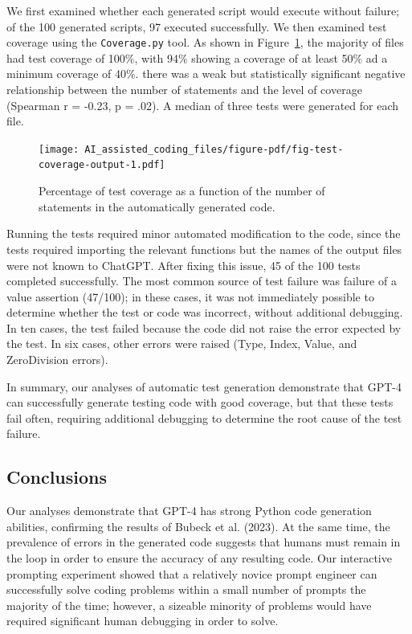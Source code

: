 \documentclass[
]{article}
\begin{document}
We first examined whether each generated script would execute without
failure; of the 100 generated scripts, 97 executed successfully. We then
examined test coverage using the \texttt{Coverage.py} tool. As shown in
Figure~\ref{fig-test-coverage}, the majority of files had test coverage
of 100\%, with 94\% showing a coverage of at least 50\% ad a minimum
coverage of 40\%. there was a weak but statistically significant
negative relationship between the number of statements and the level of
coverage (Spearman r = -0.23, p = .02). A median of three tests were
generated for each file.

\begin{figure}

{\centering \texttt{[image: AI\_assisted\_coding\_files/figure-pdf/fig-test-coverage-output-1.pdf]}

}

\caption{\label{fig-test-coverage}Percentage of test coverage as a
function of the number of statements in the automatically generated
code.}

\end{figure}

Running the tests required minor automated modification to the code,
since the tests required importing the relevant functions but the names
of the output files were not known to ChatGPT. After fixing this issue,
45 of the 100 tests completed successfully. The most common source of
test failure was failure of a value assertion (47/100); in these cases,
it was not immediately possible to determine whether the test or code
was incorrect, without additional debugging. In ten cases, the test
failed because the code did not raise the error expected by the test. In
six cases, other errors were raised (Type, Index, Value, and
ZeroDivision errors).

In summary, our analyses of automatic test generation demonstrate that
GPT-4 can successfully generate testing code with good coverage, but
that these tests fail often, requiring additional debugging to determine
the root cause of the test failure.

\hypertarget{conclusions}{%
\subsection{Conclusions}\label{conclusions}}

Our analyses demonstrate that GPT-4 has strong Python code generation
abilities, confirming the results of Bubeck et al. (2023). At the same
time, the prevalence of errors in the generated code suggests that
humans must remain in the loop in order to ensure the accuracy of any
resulting code. Our interactive prompting experiment showed that a
relatively novice prompt engineer can successfully solve coding problems
within a small number of prompts the majority of the time; however, a
sizeable minority of problems would have required significant human
debugging in order to solve.
\end{document}
